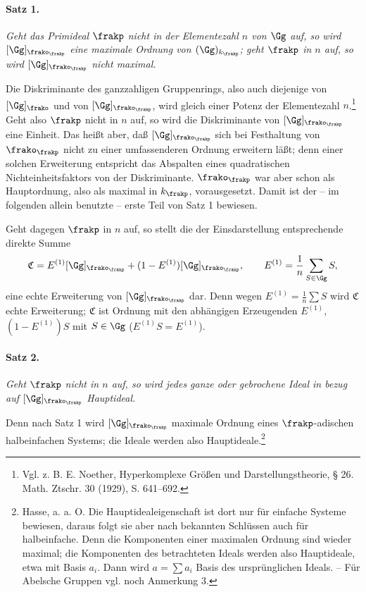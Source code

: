 \paragraph{Satz 1.}
\emph{Geht das Primideal \(\frakp\) nicht in der Elementezahl \(n\) von \(\Gg\) auf, so wird \([\Gg]_{\frako_\frakp}\) eine maximale Ordnung von \((\Gg)_{k_\frakp}\); geht \(\frakp\) in \(n\) auf, so wird \([\Gg]_{\frako_\frakp}\) nicht maximal.}

Die Diskriminante des ganzzahligen Gruppenrings, also auch diejenige von \([\Gg]_\frako\) und von \([\Gg]_{\frako_\frakp}\), wird gleich einer Potenz der Elementezahl \(n\).\footnote{Vgl. z. B. E. Noether, Hyperkomplexe Größen und Darstellungstheorie, § 26. Math. Ztschr. 30 (1929), S. 641--692.} Geht also \(\frakp\) nicht in \(n\) auf, so wird die Diskriminante von \([\Gg]_{\frako_\frakp}\) eine Einheit. Das heißt aber, daß \([\Gg]_{\frako_\frakp}\) sich bei Festhaltung von \(\frako_\frakp\) nicht zu einer umfassenderen Ordnung erweitern läßt; denn einer solchen Erweiterung entspricht das Abspalten eines quadratischen Nichteinheitsfaktors von der Diskriminante. \(\frako_\frakp\) war aber schon als Hauptordnung, also als maximal in \(k_\frakp\), vorausgesetzt. Damit ist der -- im folgenden allein benutzte -- erste Teil von Satz 1 bewiesen.

Geht dagegen \(\frakp\) in \(n\) auf, so stellt die der Einsdarstellung entsprechende direkte Summe
\[
        \mathfrak C=E^{(1)}[\Gg]_{\frako_\frakp}+(1-E^{(1)})[\Gg]_{\frako_\frakp},
        \qquad
        E^{(1)}=\frac1n\sum_{S\in\Gg} S,
\]
eine echte Erweiterung von \([\Gg]_{\frako_\frakp}\) dar. Denn wegen \(E^{(1)}=\frac1n\sum S\) wird \(\mathfrak C\) echte Erweiterung; \(\mathfrak C\) ist Ordnung mit den abhängigen Erzeugenden \(E^{(1)}\), \((1-E^{(1)})S\) mit \(S\in\Gg\) (\(E^{(1)}S=E^{(1)}\)).

\paragraph{Satz 2.}
\emph{Geht \(\frakp\) nicht in \(n\) auf, so wird jedes ganze oder gebrochene Ideal in bezug auf \([\Gg]_{\frako_\frakp}\) Hauptideal.}

Denn nach Satz 1 wird \([\Gg]_{\frako_\frakp}\) maximale Ordnung eines \(\frakp\)-adischen halbeinfachen Systems; die Ideale werden also Hauptideale.\footnote{Hasse, a. a. O. Die Hauptidealeigenschaft ist dort nur für einfache Systeme bewiesen, daraus folgt sie aber nach bekannten Schlüssen auch für halbeinfache. Denn die Komponenten einer maximalen Ordnung sind wieder maximal; die Komponenten des betrachteten Ideals werden also Hauptideale, etwa mit Basis \(a_i\). Dann wird \(a=\sum a_i\) Basis des ursprünglichen Ideals. -- Für Abelsche Gruppen vgl. noch Anmerkung 3.}

